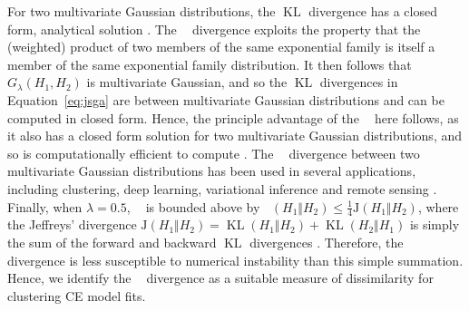 \documentclass[
  12pt]{article}
\DeclareMathOperator{\KL}{\mathrm{KL}}
\newcommand{\JSGa}{\mathop{\mathrm{JS}^{\mathrm{G}_{\lambda}}}\nolimits}
\begin{document}
For two multivariate Gaussian distributions, the $\KL{}$ divergence has a closed form, analytical solution \citep{Duchi2007}.
The $\JSGa{}$ divergence exploits the property that the (weighted) product of two members of the same exponential family is itself a member of the same exponential family distribution. 
It then follows that $G_{\lambda}(H_1, H_2)$ is multivariate Gaussian, and so the $\KL{}$ divergences in Equation~\eqref{eq:jsga} are between multivariate Gaussian distributions and can be computed in closed form.
Hence, the principle advantage of the $\JSGa{}$ here follows, as it also has a closed form solution for two multivariate Gaussian distributions, and so is computationally efficient to compute \citep{Nielsen2019}.
The $\JSGa{}$ divergence between two multivariate Gaussian distributions has been used in several applications, including clustering, deep learning, variational inference and remote sensing \citep{Nielsen2019, Deasy2020, Ni2023-cd, Thiagarajan2025}. 
Finally, when $\lambda = 0.5$, $\JSGa{}$ is bounded above by $\JSGa{(H_1 \Vert H_2)} \leq \frac{1}{4} \mathrm{J}(H_1 \Vert H_2)$,
where the Jeffreys' divergence $\mathrm{J}(H_1 \Vert H_2) = \KL{(H_1 \Vert H_2)} + \KL{(H_2 \Vert H_1)}$ is simply the sum of the forward and backward $\KL{}$ divergences \citep{Nielsen2025}.
Therefore, the $\JSGa{}$ divergence is less susceptible to numerical instability than this simple summation. %
Hence, we identify the $\JSGa{}$ divergence as a suitable measure of dissimilarity for clustering CE model fits.
\end{document}
